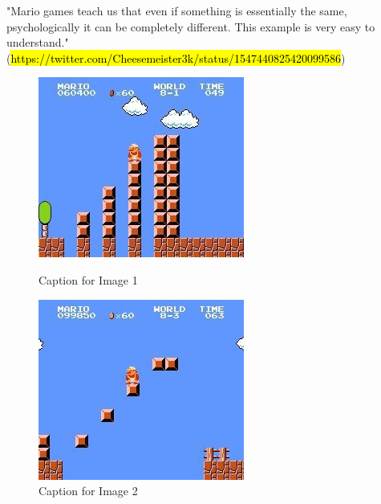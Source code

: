 \documentclass{article}
\begin{document}
"Mario games teach us that even if something is essentially the same, psychologically it can be completely different. This example is very easy to understand." (\hl{https://twitter.com/Cheesemeister3k/status/1547440825420099586})

\begin{figure}[ht]
    \centering
    \begin{minipage}[b]{0.45\linewidth}
      \includegraphics[width=\linewidth]{Images/cheeseMeister3kMario1.jpg}
      \caption{Caption for Image 1}
      \label{fig:image1}
    \end{minipage}
    \hspace{0.5cm} %
    \begin{minipage}[b]{0.45\linewidth}
      \includegraphics[width=\linewidth]{Images/cheeseMeister3kMario2.jpg}
      \caption{Caption for Image 2}
      \label{fig:image2}
    \end{minipage}
  \end{figure}
\end{document}
